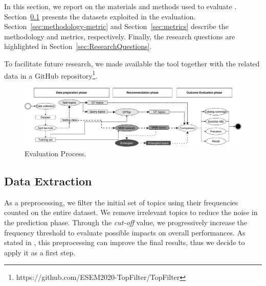





In this section, we report on the materials and methods used to evaluate \TF. %
Section~\ref{sec:Dataset} presents the datasets exploited in the evaluation. Section~\ref{sec:methodology-metric} and Section~\ref{sec:metrics} describe the methodology and metrics, respectively. Finally, the research questions are highlighted in Section~\ref{sec:ResearchQuestions}.

To facilitate future research, we made available the \TF tool together with the related data in a GitHub repository\footnote{https://github.com/ESEM2020-TopFilter/TopFilter}.


\begin{figure}[h!]
	\centering
	\includegraphics[width=0.9\linewidth,keepaspectratio]{figs/evaluationCF.pdf}
	\caption{Evaluation Process.}
	\label{fig:EvaluationProcess}
	\vspace{-.3cm}
\end{figure}

\subsection{Data Extraction} \label{sec:Dataset}




As a preprocessing, we filter the initial set of topics using their frequencies counted on the entire \GH dataset. We remove irrelevant topics to reduce the noise in the prediction phase. Through the \emph{cut-off} value, we progressively increase the frequency threshold to evaluate possible impacts on overall performances. As stated in \cite{repo-topix}, this preprocessing can improve the final results, thus we decide to apply it as a first step. 

